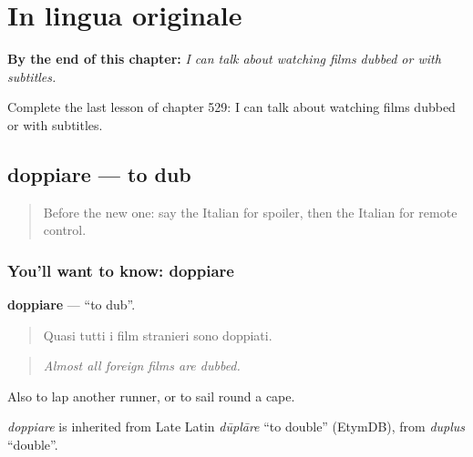 
\chapter{In lingua originale}
\label{ch:it-in-lingua-originale}

\begin{chapteropening}
\textbf{By the end of this chapter:} \emph{I can talk about watching films dubbed or with subtitles.}

Complete the last lesson of chapter 529: I can talk about watching films dubbed or with subtitles.
\end{chapteropening}

\section[doppiare]{doppiare — to dub}

\label{lesson:IT-C529-doppiare}



\begin{quote}
Before the new one: say the Italian for spoiler, then the Italian for remote control.
\end{quote}

\subsection*{You'll want to know: doppiare}
\textbf{doppiare} — \textquotedblleft{}to dub\textquotedblright{}.

\begin{quote}
Quasi tutti i film stranieri sono doppiati.
\end{quote}

\begin{quote}
\emph{Almost all foreign films are dubbed.}
\end{quote}

Also to lap another runner, or to sail round a cape.

\begin{cousinweb}
\emph{doppiare} is inherited from Late Latin \emph{dūplāre} \textquotedblleft{}to double\textquotedblright{} (EtymDB), from \emph{duplus} \textquotedblleft{}double\textquotedblright{}.
\end{cousinweb}

